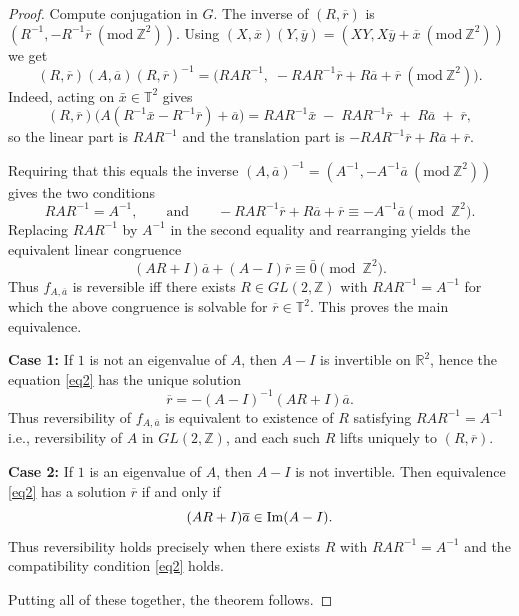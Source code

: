 \documentclass[12pt]{amsart}
\theoremstyle{plain}
\theoremstyle{definition}
\theoremstyle{remark}
\begin{document}
\begin{proof}
Compute conjugation in \(G\).  The inverse of \((R,\overline{r})\) is \((R^{-1},-R^{-1}\overline{r}~(\text{mod}~\mathbb{Z}^2))\). Using
\((X,\overline{x})(Y,\overline{y})=(XY,X\overline{y}+\overline{x}~(\text{mod}~\mathbb{Z}^2))\) we get
$$
(R,\overline{r})(A,\overline{a})(R,\overline{r})^{-1}
= \bigl(RAR^{-1},\; -RAR^{-1}\overline{r} + R\overline{a} + \overline{r}~(\text{mod}~\mathbb{Z}^2) \bigr).
$$
Indeed, acting on \(\bar{x}\in\mathbb{T}^2\) gives
$$
(R,\overline{r})\bigl( A(R^{-1}\bar{x} - R^{-1}\overline{r}) + \overline{a} \bigr)
= R A R^{-1} \bar{x} \;-\; R A R^{-1} \overline{r} \;+\; R \overline{a} \;+\; \overline{r},
$$
so the linear part is \(RAR^{-1}\) and the translation part is \(-RAR^{-1}\overline{r} + R\overline{a} + \overline{r}\).

Requiring that this equals the inverse \((A,\overline{a})^{-1}=(A^{-1},-A^{-1}\overline{a}~(\text{mod}~\mathbb{Z}^2))\) gives the two
conditions
$$
RAR^{-1}=A^{-1},
\qquad\text{and}\qquad
- R A R^{-1} \overline{r} + R \overline{a} + \overline{r} \equiv -A^{-1} \overline{a} \pmod{\mathbb{Z}^2}.
$$
Replacing \(RAR^{-1}\) by \(A^{-1}\) in the second equality and rearranging yields
the equivalent linear congruence
$$
(AR + I)\overline{a} + (A - I)\overline{r}\equiv \bar{0}\pmod{\mathbb{Z}^2}.
$$
Thus \(f_{A,\overline{a}}\) is reversible iff there exists \(R\in GL(2,\mathbb{Z})\) with \(RAR^{-1}=A^{-1}\) for which
the above congruence is solvable for \(\overline{r}\in \mathbb{T}^2\).  This proves the main equivalence.

\medskip\noindent
\textbf{Case 1:}
If $1$ is not an eigenvalue of $A$, then $A-I$ is invertible on $\mathbb{R}^2$, hence 
the equation \eqref{eq2} has the unique solution
$$
\overline{r} = -(A-I)^{-1}(AR+I)\overline{a}.
$$
Thus reversibility of $f_{A,\overline{a}}$ is equivalent to existence of $R$ satisfying $RAR^{-1}=A^{-1}$ i.e., reversibility of $A$ in $GL(2,\mathbb{Z})$, and each such 
$R$ lifts uniquely to $(R,\overline{r})$.

\medskip\noindent
\textbf{Case 2:}
If $1$ is an eigenvalue of $A$, then $A-I$ is not invertible.  
Then equivalence \eqref{eq2} has a solution $\overline{r}$ if and only if
$$(AR+I)\overline{a} \in {\rm Im}(A-I).
$$
Thus reversibility holds precisely when there exists $R$ with
$RAR^{-1}=A^{-1}$
and the compatibility condition \eqref{eq2} holds.

Putting all of these together, the theorem follows.
\end{proof}
\end{document}
